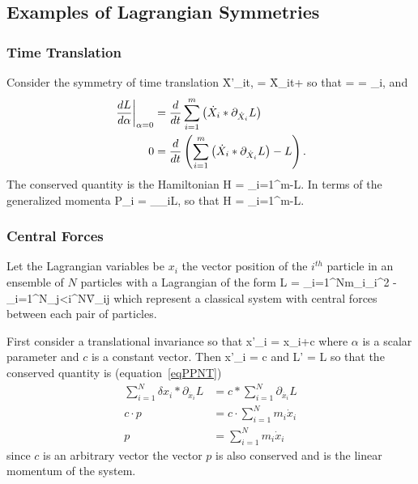 \subsection{Examples of Lagrangian Symmetries}

\subsubsection{Time Translation}

Consider the symmetry of time translation
\be
	\f{X'_{i}}{t,\alpha} = \f{X_{i}}{t+\alpha}
\ee 
so that 
\be
	 =  = _{i},
\ee
and
\begin{align}
	\left .\displaystyle\frac{d{L}}{d{\alpha}}\right |_{\alpha=0} &= \displaystyle\frac{d{}}{d{t}}\sum_{i=1}^{m}\left ( {\dot{X}_{i}*\partial_{\dot{X}_{i}}L} \right ) \\
	0 &= \displaystyle\frac{d{}}{d{t}}\left ( {\sum_{i=1}^{m}\left ( {\dot{X}_{i}*\partial_{\dot{X}_{i}}L} \right )-L} \right ).
\end{align}
The conserved quantity is the Hamiltonian
\be
	H = \sum_{i=1}^{m}-L.
\ee
In terms of the generalized momenta
\be
	P_{i} = \partial_{_{i}}L,
\ee
so that
\be
	H = \sum_{i=1}^{m}-L.
\ee


\subsubsection{Central Forces}
Let the Lagrangian variables be $x_{i}$ the vector position of the $i^{th}$ particle in an ensemble of $N$ particles with a Lagrangian of the form
\be
    L = \sum_{i=1}^{N}\half m_{i}_{i}^{2} - \sum_{i=1}^{N}\sum_{j<i}^{N}\f{V_{ij}}{}
\ee
which represent a classical system with central forces between each pair of particles.

First consider a translational invariance so that
\be
    x'_{i} = x_{i}+\alpha c
\ee
where $\alpha$ is a scalar parameter and $c$ is a constant vector.  Then
\be
    \delta x'_{i} = c
\ee
and
\be
    L' = L
\ee
so that the conserved quantity is (equation~\ref{eqPPNT})
\begin{align}
    \sum_{i=1}^{N}\delta x_{i} * \partial_{\dot{x_{i}}} L &= c * \sum_{i=1}^{N} \partial_{\dot{x_{i}}} L \nonumber \\
    c\cdot p &= c \cdot \sum_{i=1}^{N} m_{i}\dot{x}_{i} \nonumber \\
    p &= \sum_{i=1}^{N} m_{i}\dot{x}_{i}
\end{align}
since $c$ is an arbitrary vector the vector $p$ is also conserved and is the linear momentum of the system.

